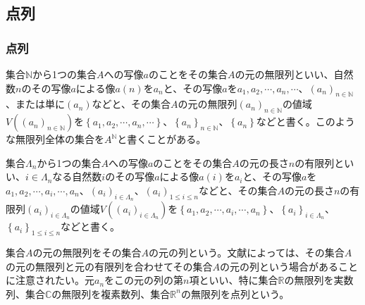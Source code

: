 \documentclass[dvipdfmx]{jsarticle}
\begin{document}
\subsection{点列}%
\subsubsection{点列}%
\begin{dfn}
集合$\mathbb{N}$から1つの集合$A$への写像$a$のことをその集合$A$の元の無限列といい、自然数$n$のその写像$a$による像$a(n)$を$a_{n}$と、その写像$a$を$a_{1},a_{2},\cdots,a_{n},\cdots$、$\left( a_{n} \right)_{n \in \mathbb{N}}$、または単に$\left( a_{n} \right)$などと、その集合$A$の元の無限列$\left( a_{n} \right)_{n \in \mathbb{N}}$の値域$V\left( \left( a_{n} \right)_{n \in \mathbb{N}} \right)$を$\left\{ a_{1},a_{2},\cdots,a_{n},\cdots \right\}$、$\left\{ a_{n} \right\}_{n \in \mathbb{N}}$、$\left\{ a_{n} \right\}$などと書く。このような無限列全体の集合を$A^{\mathbb{N}}$と書くことがある。
\end{dfn}
\begin{dfn}
集合$\varLambda_{n}$から1つの集合$A$への写像$a$のことをその集合$A$の元の長さ$n$の有限列といい、$i \in \varLambda_{n}$なる自然数$i$のその写像$a$による像$a(i)$を$a_{i}$と、その写像$a$を$a_{1},a_{2},\cdots,a_{i},\cdots,a_{n}$、$\left( a_{i} \right)_{i \in \varLambda_{n}}$、$\left( a_{i} \right)_{1 \leq i \leq n}$などと、その集合$A$の元の長さ$n$の有限列$\left( a_{i} \right)_{i \in \varLambda_{n}}$の値域$V\left( \left( a_{i} \right)_{i \in \varLambda_{n}} \right)$を$\left\{ a_{1},a_{2},\cdots,a_{i},\cdots,a_{n} \right\}$、$\left\{ a_{i} \right\}_{i \in \varLambda_{n}}$、$\left\{ a_{i} \right\}_{1 \leq i \leq n}$などと書く。
\end{dfn}
\begin{dfn}
集合$A$の元の無限列をその集合$A$の元の列という。文献によっては、その集合$A$の元の無限列と元の有限列を合わせてその集合$A$の元の列という場合があることに注意されたい。元$a_{n}$をこの元の列の第$n$項といい、特に集合$\mathbb{R}$の無限列を実数列、集合$\mathbb{C}$の無限列を複素数列、集合$\mathbb{R}^{n}$の無限列を点列という。
\end{dfn}
\end{document}
